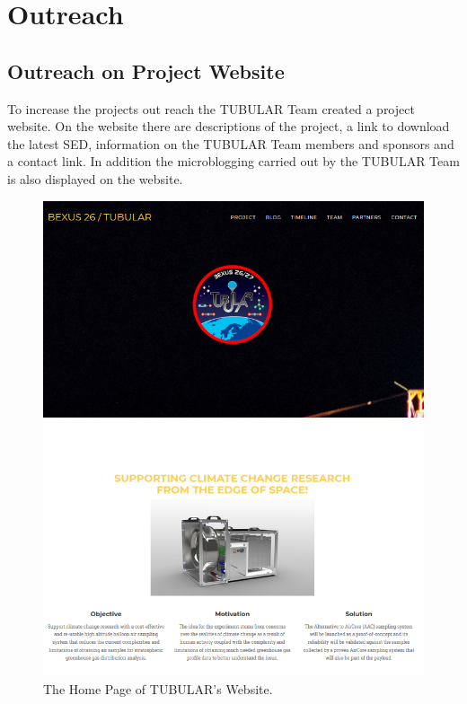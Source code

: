 \section{Outreach} \label{sec:appE}

\subsection{Outreach on Project Website}

To increase the projects out reach the TUBULAR Team created a project website. On the website there are descriptions of the project, a link to download the latest SED, information on the TUBULAR Team members and sponsors and a contact link. In addition the microblogging carried out by the TUBULAR Team is also displayed on the website.

\begin{figure}[H]
    \centering
    \includegraphics[width=0.9\linewidth]{appendix/img/outreach/outreach-tubwebsite-front.PNG}
    \caption{The Home Page of TUBULAR's Website.}
    \label{fig:outreach-tubwebsite}
\end{figure}
